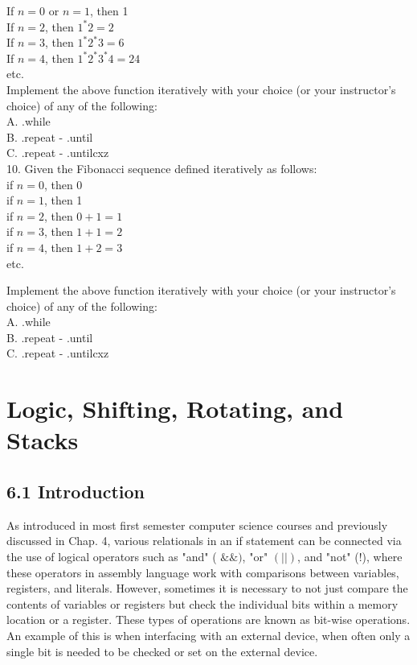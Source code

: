 \documentclass[10pt]{book}
\begin{document}
If $n=0$ or $n=1$, then 1\\
If $n=2$, then $1^{*} 2=2$\\
If $n=3$, then $1^{*} 2^{*} 3=6$\\
If $n=4$, then $1^{*} 2^{*} 3^{*} 4=24$\\
etc.\\
Implement the above function iteratively with your choice (or your instructor's choice) of any of the following:\\
A. .while\\
B. .repeat - .until\\
C. .repeat - .untilcxz\\
10. Given the Fibonacci sequence defined iteratively as follows:\\
if $n=0$, then 0\\
if $n=1$, then 1\\
if $n=2$, then $0+1=1$\\
if $n=3$, then $1+1=2$\\
if $n=4$, then $1+2=3$\\
etc.

Implement the above function iteratively with your choice (or your instructor's choice) of any of the following:\\
A. .while\\
B. .repeat - .until\\
C. .repeat - .untilcxz

\section*{Logic, Shifting, Rotating, and Stacks}
\subsection*{6.1 Introduction}
As introduced in most first semester computer science courses and previously discussed in Chap. 4, various relationals in an if statement can be connected via the use of logical operators such as "and" ( $\& \&)$, "or" $(|\mid)$, and "not" (!), where these operators in assembly language work with comparisons between variables, registers, and literals. However, sometimes it is necessary to not just compare the contents of variables or registers but check the individual bits within a memory location or a register. These types of operations are known as bit-wise operations. An example of this is when interfacing with an external device, when often only a single bit is needed to be checked or set on the external device.
\end{document}
